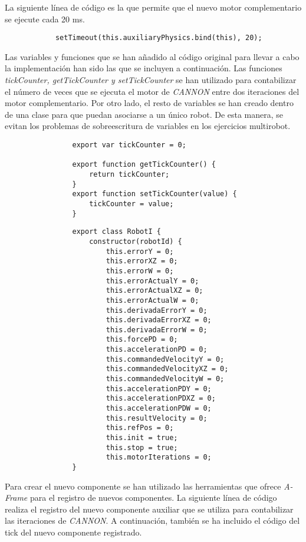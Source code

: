 La siguiente línea de código es la que permite que el nuevo motor complementario se ejecute cada 20 ms.
\small {
\begin{verbatim}
            setTimeout(this.auxiliaryPhysics.bind(this), 20);
\end{verbatim}
}
\normalsize
Las variables y funciones que se han añadido al código original para llevar a cabo la implementación han sido las que se incluyen a continuación. Las funciones \textit{tickCounter, getTickCounter y setTickCounter} se han utilizado para contabilizar el número de veces que se ejecuta el motor de \textit{CANNON} entre dos iteraciones del motor complementario. Por otro lado, el resto de variables se han creado dentro de una clase para que puedan asociarse a un único robot. De esta manera, se evitan los problemas de sobreescritura de variables en los ejercicios multirobot.

\small {
\begin{verbatim}
                export var tickCounter = 0;
                
                export function getTickCounter() {
                    return tickCounter;
                }
                export function setTickCounter(value) {
                    tickCounter = value;
                }
\end{verbatim}
}


\small {
\begin{verbatim}
                export class RobotI {
                    constructor(robotId) {
                        this.errorY = 0;
                        this.errorXZ = 0;
                        this.errorW = 0;
                        this.errorActualY = 0;
                        this.errorActualXZ = 0;
                        this.errorActualW = 0;
                        this.derivadaErrorY = 0;
                        this.derivadaErrorXZ = 0;
                        this.derivadaErrorW = 0;
                        this.forcePD = 0;
                        this.accelerationPD = 0;
                        this.commandedVelocityY = 0;
                        this.commandedVelocityXZ = 0;
                        this.commandedVelocityW = 0;
                        this.accelerationPDY = 0;
                        this.accelerationPDXZ = 0;
                        this.accelerationPDW = 0;
                        this.resultVelocity = 0;
                        this.refPos = 0;
                        this.init = true;
                        this.stop = true;
                        this.motorIterations = 0;
                }
\end{verbatim}
}
\normalsize
Para crear el nuevo componente se han utilizado las herramientas que ofrece \textit{A-Frame} para el registro de nuevos componentes. La siguiente línea de código realiza el registro del nuevo componente auxiliar que se utiliza para contabilizar las iteraciones de \textit{CANNON}. A continuación, también se ha incluido el código del tick del nuevo componente registrado.

